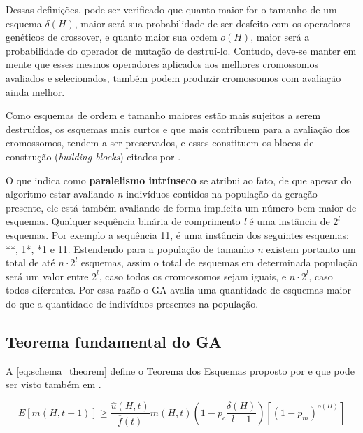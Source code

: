 Dessas definições, pode ser verificado que quanto maior for o tamanho de um esquema \(\delta(H)\), maior será sua probabilidade de ser desfeito com os operadores genéticos de crossover, e quanto maior sua ordem \(o(H)\), maior será a probabilidade do operador de mutação de destruí-lo. Contudo, deve-se manter em mente que esses mesmos operadores aplicados aos melhores cromossomos avaliados e selecionados, também podem produzir cromossomos com avaliação ainda melhor.

Como esquemas de ordem e tamanho maiores estão mais sujeitos a serem destruídos, os esquemas mais curtos e que mais contribuem para a avaliação dos cromossomos, tendem a ser preservados, e esses constituem os blocos de construção (\textit{building blocks}) citados por \citeauthor{Goldberg1989}.

O que \citeauthor{Holland1992} indica como \textbf{paralelismo intrínseco} se atribui ao fato, de que apesar do algoritmo estar avaliando \textit{n} indivíduos contidos na população da geração presente, ele está também avaliando de forma implícita um número bem maior de esquemas. Qualquer sequência binária de comprimento \textit{l} é uma instância de \(2^l\) esquemas. Por exemplo a sequência 11, é uma instância dos seguintes esquemas: **, 1*, *1 e 11. Estendendo para a população de tamanho \textit{n} existem portanto um total de até \(n \cdot 2^l\) esquemas, assim o total de esquemas em determinada população será um valor entre \(2^l\), caso todos os cromossomos sejam iguais, e \(n \cdot 2^l\), caso todos diferentes. Por essa razão o GA avalia uma quantidade de esquemas maior do que a quantidade de indivíduos presentes na população.

\subsection{Teorema fundamental do GA}
A \autoref{eq:schema_theorem} define o Teorema dos Esquemas proposto por \citeauthor{Holland1992} e que pode ser visto também em .

\begin{equation}
E[m(H,t+1)] \ge \frac{\hat{u}(H,t)}{\overline{f}(t)} m(H,t)\left( 1 - p_c \frac{\delta(H)}{l - 1} \right) \left[(1 - p_m)^{o(H)} \right]
\label{eq:schema_theorem}
\end{equation}

